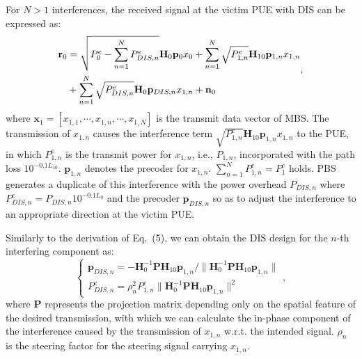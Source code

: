 \documentclass[10pt, conference, letterpaper]{IEEEtran}
\begin{document}
For $N>1$ interferences, the received signal at the victim PUE with DIS can be expressed as:
\begin{equation}
\vspace*{-0.05in}
\begin{aligned}
\mathbf{r}_{0}&=\sqrt{P^{e}_{0}-\sum^{N}_{n=1}P^{e}_{DIS,n}}\mathbf{H}_{0}\mathbf{p}_{0}x_{0}
+\sum^{N}_{n=1}\sqrt{P^{e}_{1,n}}\mathbf{H}_{10}\mathbf{p}_{1,n}x_{1,n}\\
&+\sum^{N}_{n=1}\sqrt{P^{e}_{DIS,n}}\mathbf{H}_{0}\mathbf{p}_{DIS,n}x_{1,n}+\mathbf{n}_{0}
\end{aligned},
\end{equation}
where $\mathbf{x}_{1}=[x_{1,1},\cdots,x_{1,n},\cdots,x_{1,N}]$ is the transmit data vector of MBS.
The transmission of $x_{1,n}$ causes the interference term
$\sqrt{P^{e}_{1,n}}\mathbf{H}_{10}\mathbf{p}_{1,n}x_{1,n}$ to the PUE,
in which $P^{e}_{1,n}$ is the transmit power for $x_{1,n}$, i.e., $P_{1,n}$,
incorporated with the path loss $10^{-0.1L_{10}}$.
$\mathbf{p}_{1,n}$ denotes the precoder for $x_{1,n}$.
$\sum^{N}_{n=1}P^{e}_{1,n}=P^{e}_{1}$ holds.
PBS generates a duplicate of this interference with the power overhead $P_{DIS,n}$
where $P^{e}_{DIS,n}=P_{DIS,n}10^{-0.1L_{0}}$
and the precoder $\mathbf{p}_{DIS,n}$ so as to adjust the interference
to an appropriate direction at the victim PUE.

Similarly to the derivation of Eq.~(5),
we can obtain the DIS design for the $n$-th interfering component as:
\begin{equation}
\left\{
\begin{array}{l}
\mathbf{p}_{DIS,n}=-\mathbf{H}^{-1}_{0}\mathbf{P}\mathbf{H}_{10}\mathbf{p}_{1,n}/
\|\mathbf{H}^{-1}_{0}\mathbf{P}\mathbf{H}_{10}\mathbf{p}_{1,n}\|\\
P^{e}_{DIS,n}=\rho^{2}_{n}P^{e}_{1,n}\|\mathbf{H}^{-1}_{0}\mathbf{P}\mathbf{H}_{10}\mathbf{p}_{1,n}\|^2
\end{array}
\right.,
\end{equation}
where $\mathbf{P}$ represents the projection matrix
depending only on the spatial feature of the desired transmission,
with which we can calculate the in-phase component of the interference
caused by the transmission of $x_{1,n}$ w.r.t. the intended signal.
$\rho_{n}$ is the steering factor for the steering signal carrying $x_{1,n}$.
\end{document}
